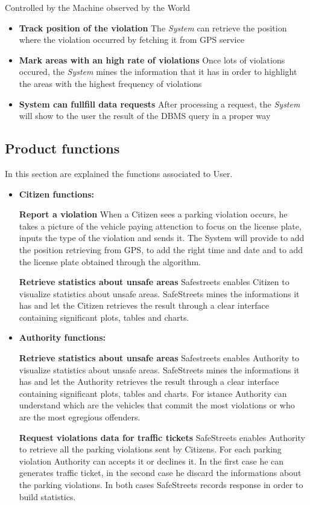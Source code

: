 \documentclass{article}
\begin{document}
Controlled by the Machine observed by the World
\begin{itemize}
    \item\textbf{Track position of the violation}
    The \textit{System} can retrieve the position where the violation occurred by fetching it from GPS service
    \item\textbf{Mark areas with an high rate of violations}
    Once lots of violations occured, the \textit{System} mines the information that it has in order to highlight the areas with the highest frequency of violations
    \item\textbf{System can fullfill data requests}
    After processing a request, the \textit{System} will show to the user the result of the DBMS query in a proper way

\end{itemize}

\subsection{Product functions}
In this section are explained the functions associated to User.
\begin{itemize}
 \item \textbf{Citizen functions:}
 
 \textbf{Report a violation}
 When a Citizen sees a parking violation occurs, he takes a picture of the vehicle paying attenction to focus on the 
 license plate, inputs the type of the violation and sends it. The System will provide to add the position retrieving 
 from GPS, to add the right time and date and to add the license plate obtained through the algorithm. 

 \textbf{Retrieve statistics about unsafe areas}
Safestreets enables Citizen to visualize statistics about unsafe areas. SafeStreets mines the informations it has and let 
the Citizen retrieves the result through a clear interface containing significant plots, tables and charts. 

 \item \textbf{Authority functions:}
 
 \textbf{Retrieve statistics about unsafe areas}
 Safestreets enables Authority to visualize statistics about unsafe areas. SafeStreets mines the informations it has and let 
 the Authority retrieves the result through a clear interface containing significant plots, tables and charts. For istance 
 Authority can understand which are the vehicles that commit the most violations or who are the most egregious offenders.
  
 \textbf{Request violations data for traffic tickets}
SafeStreets enables Authority to retrieve all the parking violations sent by Citizens. For each parking violation Authority can
 accepts it or declines it. In the first case he can generates traffic ticket, in the second case he discard the informations about
 the parking violations. In both cases SafeStreets records response in order to build statistics.

\end{itemize}
\end{document}
